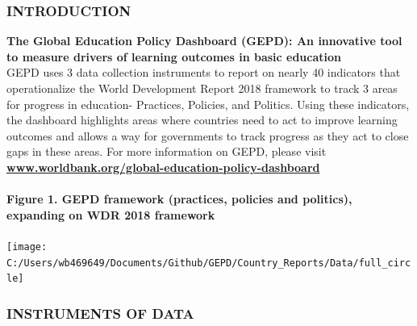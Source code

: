 \documentclass[
]{article}
\author{}
\date{\vspace{-2.5em}}
\begin{document}
\newcommand{\greynote}[1]{
    {\scriptsize
    \textcolor{darkgray}{\textit{Notes:} #1}
  }
}

\newcommand{\greysource}[1]{
    {\scriptsize
    \textcolor{darkgray}{\textit{Source:} #1}
  }
}

\newcommand{\greydisclaimer}[1]{
    {\scriptsize
    \textcolor{darkgray}{\textit{Disclaimer:} #1}
  }
}

\newcommand{\greytext}[1]{
    {\scriptsize
    \textcolor{darkgray}{#1}
  }
}

\newcommand*{\tabindent}{\hspace{1mm}}

\hypertarget{introduction}{%
\subsubsection{\texorpdfstring{\textbf{INTRODUCTION}}{INTRODUCTION}}\label{introduction}}

\textbf{The Global Education Policy Dashboard (GEPD): An innovative tool
to measure drivers of learning outcomes in basic education}\\
GEPD uses 3 data collection instruments to report on nearly 40
indicators that operationalize the World Development Report 2018
framework to track 3 areas for progress in education- Practices,
Policies, and Politics. Using these indicators, the dashboard highlights
areas where countries need to act to improve learning outcomes and
allows a way for governments to track progress as they act to close gaps
in these areas. For more information on GEPD, please visit
\textbf{\href{https://www.worldbank.org/en/topic/education/brief/global-education-policy-dashboard}{www.worldbank.org/global-education-policy-dashboard}}

\hypertarget{figure-1.-gepd-framework-practices-policies-and-politics-expanding-on-wdr-2018-framework}{%
\paragraph{Figure 1. GEPD framework (practices, policies and politics),
expanding on WDR 2018
framework}\label{figure-1.-gepd-framework-practices-policies-and-politics-expanding-on-wdr-2018-framework}}

\begin{center}\texttt{[image: C:/Users/wb469649/Documents/Github/GEPD/Country\_Reports/Data/full\_circle]} \end{center}

\hypertarget{instruments-of-data}{%
\subsubsection{\texorpdfstring{\textbf{INSTRUMENTS OF
DATA}}{INSTRUMENTS OF DATA}}\label{instruments-of-data}}
\end{document}
